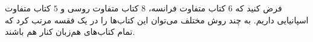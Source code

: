 \EXERCISE
فرض کنید که
$6$
کتاب متفاوت فرانسه،
$8$
کتاب متفاوت روسی و
$5$
کتاب متفاوت اسپانیایی داریم. به چند روش مختلف می‌توان این کتاب‌ها را در یک فقسه مرتب کرد که تمام کتاب‌های هم‌زبان کنار هم باشند.